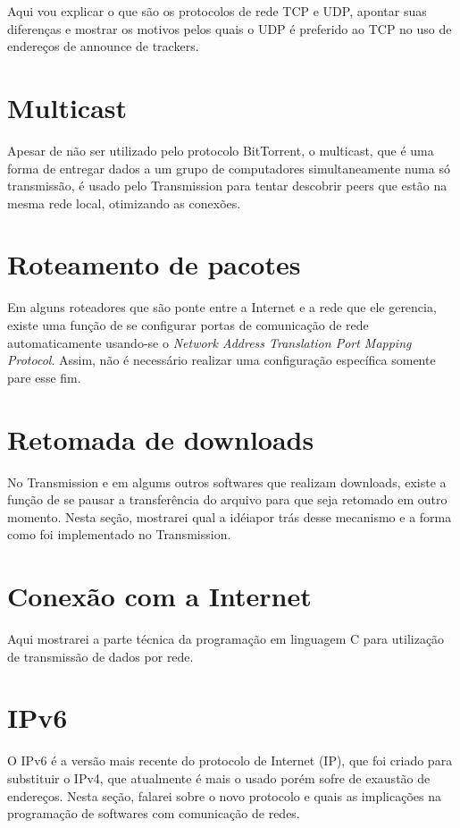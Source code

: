 Aqui vou explicar o que são os protocolos de rede TCP e UDP, apontar suas diferenças e
mostrar os motivos pelos quais o UDP é preferido ao TCP no uso de endereços de
\gls*{announce} de \glspl*{tracker}.

\section{Multicast}

Apesar de não ser utilizado pelo protocolo BitTorrent, o multicast, que é uma forma de
entregar dados a um grupo de computadores simultaneamente numa só transmissão, é usado
pelo Transmission para tentar descobrir \glspl*{peer} que estão na mesma rede local,
otimizando as conexões.

\section{Roteamento de pacotes} %

Em alguns roteadores que são ponte entre a Internet e a rede que ele gerencia, existe
uma função de se configurar portas de comunicação de rede automaticamente usando-se o
\emph{Network Address Translation Port Mapping Protocol}. Assim, não é necessário
realizar uma configuração específica somente pare esse fim.

\section{Retomada de downloads}

No Transmission e em algums outros softwares que realizam downloads, existe a função de
se pausar a transferência do arquivo para que seja retomado em outro momento. Nesta
seção, mostrarei qual a idéiapor trás desse mecanismo e a forma como foi implementado no
Transmission.

\section{Conexão com a Internet}

Aqui mostrarei a parte técnica da programação em linguagem C para utilização de
transmissão de dados por rede.

\section{IPv6}

O IPv6 é a versão mais recente do protocolo de Internet (IP), que foi criado para
substituir o IPv4, que atualmente é mais o usado porém sofre de exaustão de endereços.
Nesta seção, falarei sobre o novo protocolo e quais as implicações na programação de
softwares com comunicação de redes.

